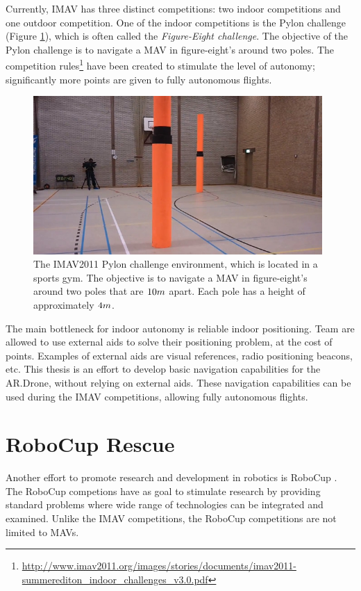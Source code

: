 Currently, IMAV has three distinct competitions: two indoor competitions and one outdoor competition.
One of the indoor competitions is the Pylon challenge (Figure \ref{fig:imav2011_pylon}), which is often called the \textit{Figure-Eight challenge}.
The objective of the Pylon challenge is to navigate a MAV in figure-eight’s around two poles.
The competition rules\footnote{\url{http://www.imav2011.org/images/stories/documents/imav2011-summerediton_indoor_challenges_v3.0.pdf}} have been created to stimulate the level of autonomy; significantly more points are given to fully autonomous flights.

\begin{figure}[htb]
\centering
\includegraphics[width=11cm]{images/imav2011_pylon.jpg}
\caption{The IMAV2011 Pylon challenge environment, which is located in a sports gym.
The objective is to navigate a MAV in figure-eight’s around two poles that are $10\small{m}$ apart. Each pole has a height of approximately $4\small{m}$.}
\label{fig:imav2011_pylon}
\end{figure}

The main bottleneck for indoor autonomy is reliable indoor positioning.
Team are allowed to use external aids to solve their positioning problem, at the cost of points.
Examples of external aids are visual references, radio positioning beacons, etc.
This thesis is an effort to develop basic navigation capabilities for the AR.Drone, without relying on external aids.
These navigation capabilities can be used during the IMAV competitions, allowing fully autonomous flights.

	\section{RoboCup Rescue}
Another effort to promote research and development in robotics is RoboCup \cite{kitano1997robocup}.
The RoboCup competions have as goal to stimulate research by providing standard problems where wide range of technologies can be integrated and examined.
Unlike the IMAV competitions, the RoboCup competitions are not limited to MAVs.

